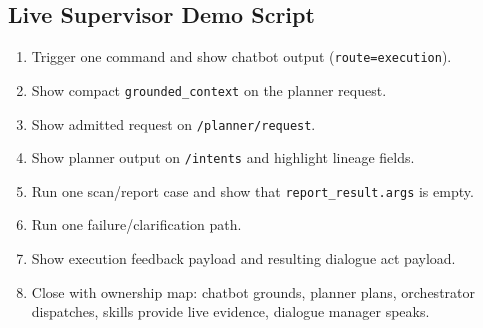 \documentclass[12pt,a4paper]{article}
\newcommand{\code}[1]{\texttt{#1}}
\begin{document}
\subsection{Live Supervisor Demo Script}

\begin{enumerate}
\item Trigger one command and show chatbot output (\code{route=execution}).
\item Show compact \code{grounded\_context} on the planner request.
\item Show admitted request on \code{/planner/request}.
\item Show planner output on \code{/intents} and highlight lineage fields.
\item Run one scan/report case and show that \code{report\_result.args} is empty.
\item Run one failure/clarification path.
\item Show execution feedback payload and resulting dialogue act payload.
\item Close with ownership map: chatbot grounds, planner plans, orchestrator dispatches, skills provide live evidence, dialogue manager speaks.
\end{enumerate}
\end{document}

